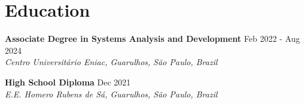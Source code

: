 \documentclass[11pt,letterpaper]{article}
\begin{document}
\section{Education}
\textbf{Associate Degree in Systems Analysis and Development} \hfill Feb 2022 - Aug 2024 \\
\textit{Centro Universitário Eniac, Guarulhos, São Paulo, Brazil}

\textbf{High School Diploma} \hfill Dec 2021 \\
\textit{E.E. Homero Rubens de Sá, Guarulhos, São Paulo, Brazil}
\end{document}
